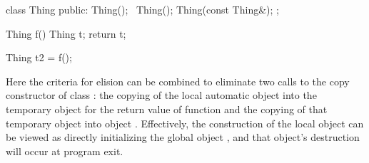 \begin{codeblock}
class Thing {
public:
    Thing();
    ~Thing();
    Thing(const Thing&);
};

Thing f() {
    Thing t;
    return t;
}

Thing t2 = f();
\end{codeblock}

Here the criteria for elision can be combined to
eliminate two calls to the copy constructor of class
:
the copying of the local automatic object
into the temporary object for the return value of
function
and the copying of that temporary object into object
.
Effectively, the construction of the local object
can be viewed as directly initializing the global
object
,
and that object's destruction will occur at program
exit.
\exitexampleb

